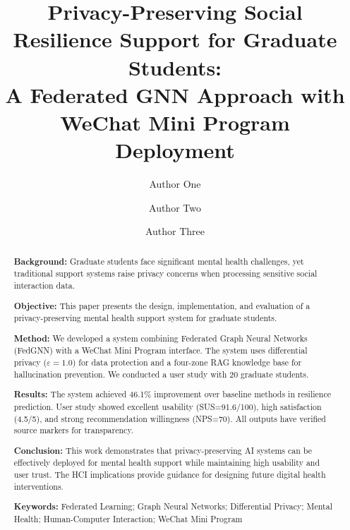 \documentclass[preprint,12pt]{elsarticle}
\begin{document}
\begin{frontmatter}

\title{Privacy-Preserving Social Resilience Support for Graduate Students: \\
A Federated GNN Approach with WeChat Mini Program Deployment}

\author[inst1]{Author One}
\author[inst1]{Author Two}
\author[inst2]{Author Three}


\begin{abstract}
\textbf{Background:} Graduate students face significant mental health challenges,
yet traditional support systems raise privacy concerns when processing sensitive
social interaction data.

\textbf{Objective:} This paper presents the design, implementation, and evaluation
of a privacy-preserving mental health support system for graduate students.

\textbf{Method:} We developed a system combining Federated Graph Neural Networks
(FedGNN) with a WeChat Mini Program interface. The system uses differential privacy
($\varepsilon=1.0$) for data protection and a four-zone RAG knowledge base for
hallucination prevention. We conducted a user study with 20 graduate students.

\textbf{Results:} The system achieved 46.1\% improvement over baseline methods
in resilience prediction. User study showed excellent usability (SUS=91.6/100),
high satisfaction (4.5/5), and strong recommendation willingness (NPS=70).
All outputs have verified source markers for transparency.

\textbf{Conclusion:} This work demonstrates that privacy-preserving AI systems
can be effectively deployed for mental health support while maintaining high
usability and user trust. The HCI implications provide guidance for designing
future digital health interventions.

\textbf{Keywords:} Federated Learning; Graph Neural Networks; Differential Privacy;
Mental Health; Human-Computer Interaction; WeChat Mini Program
\end{abstract}

\end{frontmatter}
\end{document}
